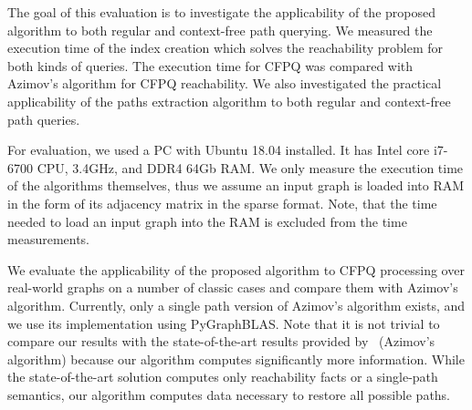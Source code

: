 
The goal of this evaluation is to investigate the applicability of the proposed algorithm to both regular and context-free path querying.
We measured the execution time of the index creation which solves the reachability problem for both kinds of queries.
The execution time for CFPQ was compared with Azimov's algorithm for CFPQ reachability.
We also investigated the practical applicability of the paths extraction algorithm to both regular and context-free path queries.

For evaluation, we used a PC with Ubuntu 18.04 installed.
It has Intel core i7-6700 CPU, 3.4GHz, and DDR4 64Gb RAM.
We only measure the execution time of the algorithms themselves, thus we assume an input graph is loaded into RAM in the form of its adjacency matrix in the sparse format.
Note, that the time needed to load an input graph into the RAM is excluded from the time measurements.


We evaluate the applicability of the proposed algorithm to CFPQ processing over real-world graphs on a number of classic cases and compare them with Azimov's algorithm.
Currently, only a single path version of Azimov's algorithm exists, and we use its implementation using PyGraphBLAS. Note that it is not trivial to compare our results with the state-of-the-art results provided by~\cite{10.1145/3398682.3399163} (Azimov's algorithm) because our algorithm computes significantly more information. While the state-of-the-art solution computes only reachability facts or a single-path semantics, our algorithm computes data necessary to restore all possible paths.


